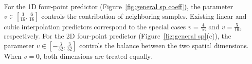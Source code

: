 
For the 1D four-point predictor (Figure~\ref{fig:general sp coeff}), the parameter $v \in \left[\frac{3}{16}, \frac{6}{16}\right]$ controls the contribution of neighboring samples.
Existing linear and cubic interpolation predictors correspond to the special cases $v=\frac{4}{16}$ and $v=\frac{5}{16}$, respectively.
For the 2D four-point predictor (Figure~\ref{fig:general sp}(c)), the parameter $v \in \left[-\frac{3}{32}, \frac{3}{32}\right]$ controls the balance between the two spatial dimensions.
When $v=0$, both dimensions are treated equally.





